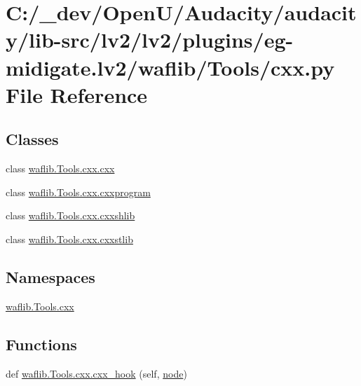 \hypertarget{lv2_2plugins_2eg-midigate_8lv2_2waflib_2_tools_2cxx_8py}{}\section{C\+:/\+\_\+dev/\+Open\+U/\+Audacity/audacity/lib-\/src/lv2/lv2/plugins/eg-\/midigate.lv2/waflib/\+Tools/cxx.py File Reference}
\label{lv2_2plugins_2eg-midigate_8lv2_2waflib_2_tools_2cxx_8py}
\subsection*{Classes}
\begin{DoxyCompactItemize}
\item 
class \hyperlink{classwaflib_1_1_tools_1_1cxx_1_1cxx}{waflib.\+Tools.\+cxx.\+cxx}
\item 
class \hyperlink{classwaflib_1_1_tools_1_1cxx_1_1cxxprogram}{waflib.\+Tools.\+cxx.\+cxxprogram}
\item 
class \hyperlink{classwaflib_1_1_tools_1_1cxx_1_1cxxshlib}{waflib.\+Tools.\+cxx.\+cxxshlib}
\item 
class \hyperlink{classwaflib_1_1_tools_1_1cxx_1_1cxxstlib}{waflib.\+Tools.\+cxx.\+cxxstlib}
\end{DoxyCompactItemize}
\subsection*{Namespaces}
\begin{DoxyCompactItemize}
\item 
 \hyperlink{namespacewaflib_1_1_tools_1_1cxx}{waflib.\+Tools.\+cxx}
\end{DoxyCompactItemize}
\subsection*{Functions}
\begin{DoxyCompactItemize}
\item 
def \hyperlink{namespacewaflib_1_1_tools_1_1cxx_a31f0414cdfdb6dd749e0f65f788bfbda}{waflib.\+Tools.\+cxx.\+cxx\+\_\+hook} (self, \hyperlink{structnode}{node})
\end{DoxyCompactItemize}

